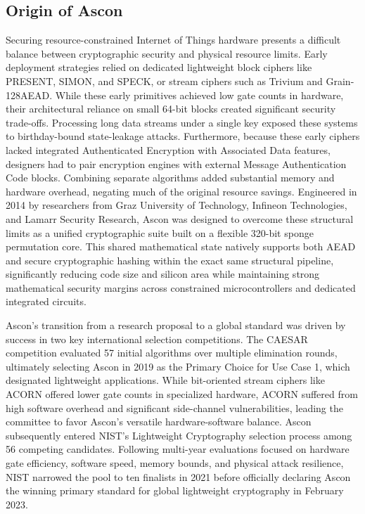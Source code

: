 \subsection{Origin of  Ascon}

Securing resource-constrained Internet of Things hardware presents a difficult balance between cryptographic security and physical resource limits. Early deployment strategies relied on dedicated lightweight block ciphers like PRESENT, SIMON, and SPECK, or stream ciphers such as Trivium and Grain-128AEAD. While these early primitives achieved low gate counts in hardware, their architectural reliance on small 64-bit blocks created significant security trade-offs. Processing long data streams under a single key exposed these systems to birthday-bound state-leakage attacks. Furthermore, because these early ciphers lacked integrated Authenticated Encryption with Associated Data features, designers had to pair encryption engines with external Message Authentication Code blocks. Combining separate algorithms added substantial memory and hardware overhead, negating much of the original resource savings. Engineered in 2014 by researchers from Graz University of Technology, Infineon Technologies, and Lamarr Security Research, Ascon was designed to overcome these structural limits as a unified cryptographic suite built on a flexible 320-bit sponge permutation core. This shared mathematical state natively supports both AEAD and secure cryptographic hashing within the exact same structural pipeline, significantly reducing code size and silicon area while maintaining strong mathematical security margins across constrained microcontrollers and dedicated integrated circuits.

Ascon’s transition from a research proposal to a global standard was driven by success in two key international selection competitions. The CAESAR competition evaluated 57 initial algorithms over multiple elimination rounds, ultimately selecting Ascon in 2019 as the Primary Choice for Use Case 1, which designated lightweight applications. While bit-oriented stream ciphers like ACORN offered lower gate counts in specialized hardware, ACORN suffered from high software overhead and significant side-channel vulnerabilities, leading the committee to favor Ascon's versatile hardware-software balance. Ascon subsequently entered NIST’s Lightweight Cryptography selection process among 56 competing candidates. Following multi-year evaluations focused on hardware gate efficiency, software speed, memory bounds, and physical attack resilience, NIST narrowed the pool to ten finalists in 2021 before officially declaring Ascon the winning primary standard for global lightweight cryptography in February 2023.

